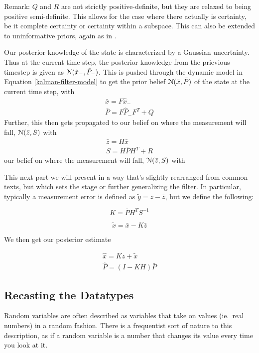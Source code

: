 Remark: $Q$ and $R$ are not strictly positive-definite, but they are relaxed to being positive semi-definite. This allows for the case where there actually is certainty, be it complete certainty or certainty within a subspace. This can also be extended to uninformative priors, again as in \cite{extended-gaussian}.

Our posterior knowledge of the state is characterized by a Gaussian uncertainty.
Thus at the current time step, the posterior knowledge from the prievious timestep is given as $\mathcal{N}(\hat{x}_-, \hat{P}_-)$.
This is pushed through the dynamic model in Equation \ref{kalman-filter-model} to get the prior belief $\mathcal{N}(\bar{x}, \bar{P})$ of the state at the current time step, with
\begin{align}
	\bar{x} = F\hat{x}_-\\
	\bar{P} = F\hat{P}_- F^T + Q
\end{align}
Further, this then gets propagated to our belief on where the measurement will fall, $\mathcal{N}(\bar{z}, S)$ with
\begin{align}
	\bar{z} = H\bar{x}\\
	S = H\bar{P} H^T + R
\end{align}
our belief on where the measurement will fall, $\mathcal{N}(\bar{z}, S)$ with

This next part we will present in a way that's slightly rearranged from common texts, but which sets the stage or further generalizing the filter.
In particular, typically a measurement error is defined as $\tilde{y} = z - \bar{z}$, but we define the following:

\begin{equation}
	K = \bar{P}H^T S^{-1}
\end{equation}

\begin{equation}
	\tilde{x} = \bar{x} - K\bar{z}
\end{equation}

We then get our posterior estimate

\begin{align}
	\hat{x} = Kz + \tilde{x} \\
	\hat{P} = (I-KH)\bar{P}
\end{align}


\subsection{Recasting the Datatypes}

Random variables are often described as variables that take on values (ie.\ real numbers) in a random fashion.
There is a frequentist sort of nature to this description, as if a random variable is a number that changes its value every time you look at it.

